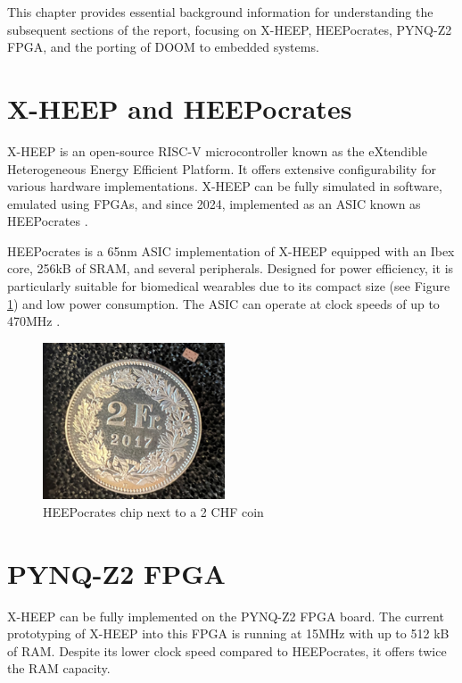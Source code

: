 This chapter provides essential background information for understanding the subsequent sections of the report, focusing on X-HEEP, HEEPocrates, PYNQ-Z2 FPGA, and the porting of DOOM to embedded systems.

\section{X-HEEP and HEEPocrates}

X-HEEP is an open-source RISC-V microcontroller known as the eXtendible Heterogeneous Energy Efficient Platform. It offers extensive configurability for various hardware implementations. X-HEEP can be fully simulated in software, emulated using FPGAs, and since 2024, implemented as an ASIC known as HEEPocrates \cite{xHeepWebsite}.

HEEPocrates is a 65nm ASIC implementation of X-HEEP equipped with an Ibex core, 256kB of SRAM, and several peripherals. Designed for power efficiency, it is particularly suitable for biomedical wearables due to its compact size (see Figure \ref{fig:HeepocratesMonnaie}) and low power consumption. The ASIC can operate at clock speeds of up to 470MHz \cite{heepocratesWebsite}.

\begin{figure}[ht]
  \centering
  \includegraphics[width=0.48\textwidth]{images/HEEPocrates_monnaie.png}
  \caption{HEEPocrates chip next to a 2 CHF coin}
  \label{fig:HeepocratesMonnaie}
\end{figure}

\section{PYNQ-Z2 FPGA}

X-HEEP can be fully implemented on the PYNQ-Z2 FPGA board. The current prototyping of X-HEEP into this FPGA is running at 15MHz with up to 512 kB of RAM. Despite its lower clock speed compared to HEEPocrates, it offers twice the RAM capacity.


